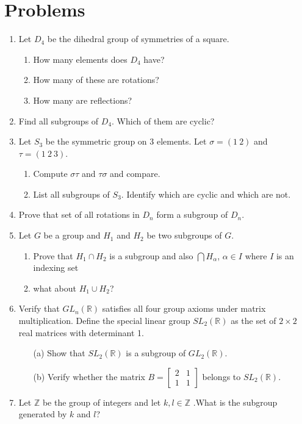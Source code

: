 \documentclass[12pt,a4paper]{article}
\begin{document}
\vspace{0.5cm}



\section{Problems}

\begin{enumerate}
    \item Let $D_4$ be the dihedral group of symmetries of a square.
    \begin{enumerate}
        \item How many elements does $D_4$ have?
        \item How many of these are rotations?
        \item How many are reflections?
    \end{enumerate}

    \item Find all subgroups of $D_4$. Which of them are cyclic?

    \item Let $S_3$ be the symmetric group on 3 elements. Let $\sigma = (1\ 2)$ and $\tau = (1\ 2\ 3)$.
    \begin{enumerate}
        \item Compute $\sigma\tau$ and $\tau\sigma$ and compare.
        \item List all subgroups of $S_3$. Identify which are cyclic and which are not.
    \end{enumerate}

    \item Prove that  set of all rotations in $D_n$ form a subgroup of $D_n$.
    \item Let $G$ be a group and $H_1$ and $H_2$ be two subgroups of $G$.
    \begin{enumerate}
    \item Prove that $H_1\cap H_2$ is a subgroup and also  $\bigcap H_\alpha$, $\alpha \in I$ where $I$ is an indexing set
    \item what about $H_1 \cup H_2$? 
\end{enumerate}
\item Verify that $GL_n(\mathbb{R})$ satisfies all four group axioms under matrix multiplication. Define the special linear group $SL_2(\mathbb{R})$ as the set of $2 \times 2$ real matrices with determinant 1.
\begin{enumerate}
    
  \item[(a)] Show that $SL_2(\mathbb{R})$ is a subgroup of $GL_2(\mathbb{R})$.
  \item[(b)] Verify whether the matrix $B = \begin{bmatrix} 2 & 1 \\ 1 & 1 \end{bmatrix}$ belongs to $SL_2(\mathbb{R})$.
  
\end{enumerate} 
\item Let  $\mathbb{Z}$ be the group of integers and let $k,l \in \mathbb{Z}$ .What is the subgroup generated by $k$ and $l$?
\vspace{2cm} %
\end{enumerate}
\end{document}
